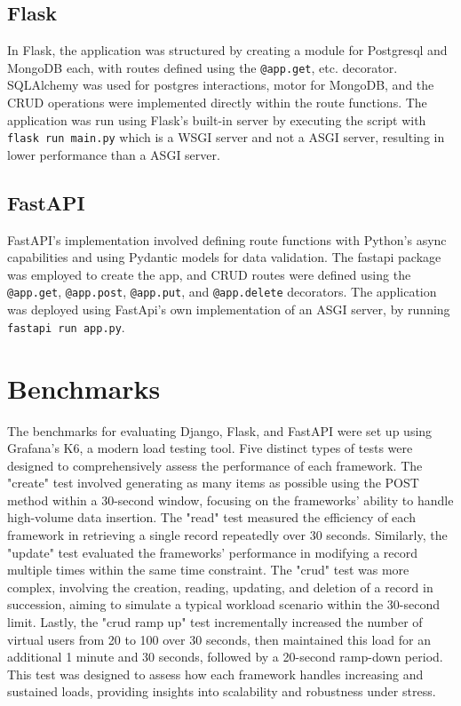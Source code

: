 \documentclass[12pt,onecolumn,a4paper,titlepage]{article}
\begin{document}
\subsection*{Flask}

In Flask, the application was structured by creating a module for Postgresql and MongoDB each, with
routes defined using the \lstinline{@app.get}, etc. decorator. SQLAlchemy was used for
postgres interactions, motor for MongoDB, and the CRUD operations were implemented directly within
the route functions. The application was run using Flask’s built-in server by
executing the script with \lstinline{flask run main.py} which is a WSGI server and not a ASGI server,
resulting in lower performance than a ASGI server.

\subsection*{FastAPI}

FastAPI’s implementation involved defining route functions with Python’s
async capabilities and using Pydantic models for data validation. The
fastapi package was employed to create the app, and CRUD routes were
defined using the \lstinline{@app.get}, \lstinline{@app.post}, \lstinline{@app.put}, and
\lstinline{@app.delete} decorators. The application was deployed using
FastApi's own implementation of an ASGI server, by running \lstinline{fastapi run app.py}.

\pagebreak

\section{Benchmarks}

The benchmarks for evaluating Django, Flask, and FastAPI were set up using
Grafana’s K6, a modern load testing tool. Five distinct types of tests were
designed to comprehensively assess the performance of each framework. The
"create" test involved generating as many items as possible using the POST
method within a 30-second window, focusing on the frameworks' ability to
handle high-volume data insertion. The "read" test measured the efficiency
of each framework in retrieving a single record repeatedly over 30 seconds.
Similarly, the "update" test evaluated the frameworks' performance in modifying
a record multiple times within the same time constraint. The "crud" test was
more complex, involving the creation, reading, updating, and deletion of a
record in succession, aiming to simulate a typical workload scenario within
the 30-second limit. Lastly, the "crud ramp up" test incrementally increased
the number of virtual users from 20 to 100 over 30 seconds, then maintained
this load for an additional 1 minute and 30 seconds, followed by a 20-second
ramp-down period. This test was designed to assess how each framework handles
increasing and sustained loads, providing insights into scalability and
robustness under stress.
\end{document}
